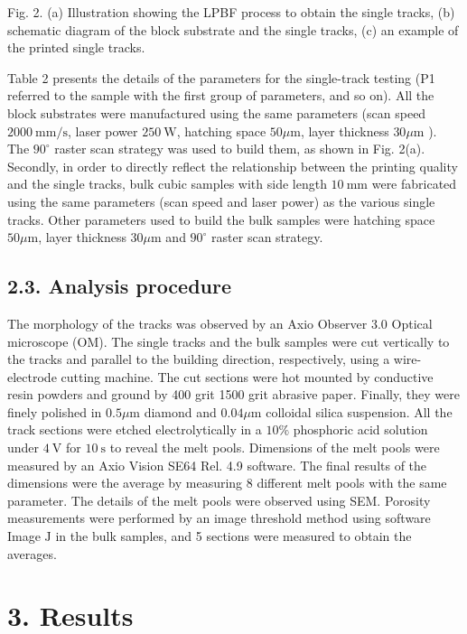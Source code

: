 \documentclass[10pt]{article}
\begin{document}
Fig. 2. (a) Illustration showing the LPBF process to obtain the single tracks, (b) schematic diagram of the block substrate and the single tracks, (c) an example of the printed single tracks.

Table 2 presents the details of the parameters for the single-track testing (P1 referred to the sample with the first group of parameters, and so on). All the block substrates were manufactured using the same parameters (scan speed $2000 \mathrm{~mm} / \mathrm{s}$, laser power $250 \mathrm{~W}$, hatching space $50 \mu \mathrm{m}$, layer thickness $30 \mu \mathrm{m}$ ). The $90^{\circ}$ raster scan strategy was used to build them, as shown in Fig. 2(a). Secondly, in order to directly reflect the relationship between the printing quality and the single tracks, bulk cubic samples with side length $10 \mathrm{~mm}$ were fabricated using the same parameters (scan speed and laser power) as the various single tracks. Other parameters used to build the bulk samples were hatching space $50 \mu \mathrm{m}$, layer thickness $30 \mu \mathrm{m}$ and $90^{\circ}$ raster scan strategy.

\subsection*{2.3. Analysis procedure}
The morphology of the tracks was observed by an Axio Observer 3.0 Optical microscope (OM). The single tracks and the bulk samples were cut vertically to the tracks and parallel to the building direction, respectively, using a wire-electrode cutting machine. The cut sections were hot mounted by conductive resin powders and ground by 400 grit 1500 grit abrasive paper. Finally, they were finely polished in $0.5 \mu \mathrm{m}$ diamond and $0.04 \mu \mathrm{m}$ colloidal silica suspension. All the track sections were etched electrolytically in a $10 \%$ phosphoric acid solution under $4 \mathrm{~V}$ for $10 \mathrm{~s}$ to reveal the melt pools. Dimensions of the melt pools were measured by an Axio Vision SE64 Rel. 4.9 software. The final results of the dimensions were the average by measuring 8 different melt pools with the same parameter. The details of the melt pools were observed using SEM. Porosity measurements were performed by an image threshold method using software Image $\mathrm{J}$ in the bulk samples, and 5 sections were measured to obtain the averages.

\section*{3. Results}
\end{document}
